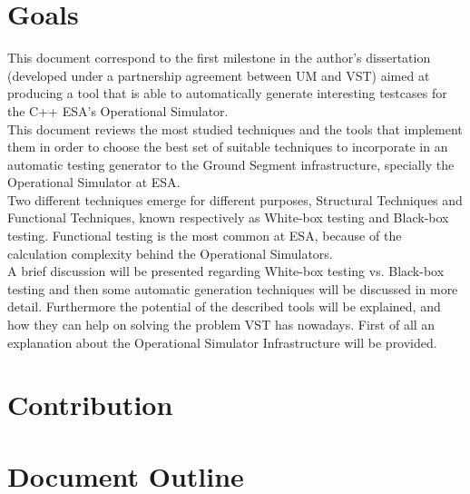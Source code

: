 \section{Goals}
This document correspond to the first milestone in the author's dissertation (developed under a partnership agreement between \ac{UM} and \ac{VST}) aimed at producing a tool
that is able to automatically generate interesting testcases for the C++ \ac{ESA}'s Operational Simulator.\\
This document reviews the most studied techniques
and the tools that implement them in order to choose the best set of
suitable techniques to incorporate in an automatic
testing generator to the Ground Segment infrastructure, specially the
Operational Simulator at \ac{ESA}.\\
Two different techniques emerge for different purposes, Structural
Techniques and Functional Techniques,
known respectively as White-box\cite{stt} testing and Black-box\cite{black} testing.
Functional testing is the most common at \ac{ESA}, because of the
calculation complexity behind the Operational Simulators.\\
A brief discussion will be presented regarding White-box testing vs. Black-box
testing and then some automatic generation techniques will be discussed in more detail.
Furthermore the potential of the described tools will be explained, and how they can help
on solving the problem \ac{VST} has nowadays. First of all an explanation about the Operational Simulator Infrastructure will be provided.

\section{Contribution}
\section{Document Outline}
\\
\secendnote
